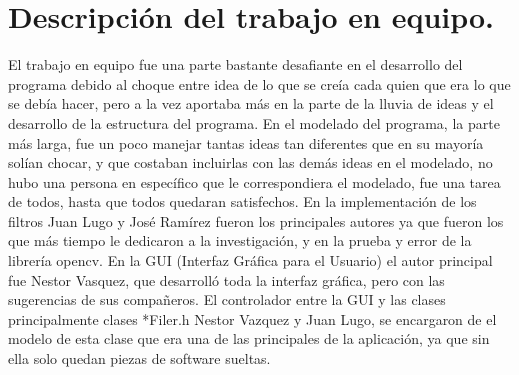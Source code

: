 \documentclass{article}
\begin{document}
\section{Descripción del trabajo en equipo.}
El trabajo en equipo fue una parte bastante desafiante en el desarrollo del programa debido al choque entre idea de lo que se creía cada quien que era lo que se debía hacer, pero a la vez aportaba más en la parte de la lluvia de ideas y el desarrollo de  la estructura del programa.\newline
En el modelado del programa, la parte más larga, fue un poco manejar tantas ideas tan diferentes que en su mayoría solían chocar, y que costaban incluirlas con las demás ideas en el modelado, no hubo una persona en específico que le correspondiera el modelado, fue una tarea de todos, hasta que todos quedaran satisfechos.\newline
En la implementación de los filtros Juan Lugo y José Ramírez fueron los principales autores ya que fueron los que más tiempo le dedicaron a la investigación, y en la prueba y error de la librería opencv.\newline
En la GUI (Interfaz Gráfica para el Usuario) el autor principal fue Nestor Vasquez, que desarrolló toda la interfaz gráfica, pero con las sugerencias de sus compañeros.\newline
El controlador entre la GUI y las clases principalmente clases *Filer.h Nestor Vazquez y Juan Lugo, se encargaron de el modelo de esta clase que era una de las principales de la aplicación, ya que sin ella solo quedan piezas de software sueltas.
\end{document}
